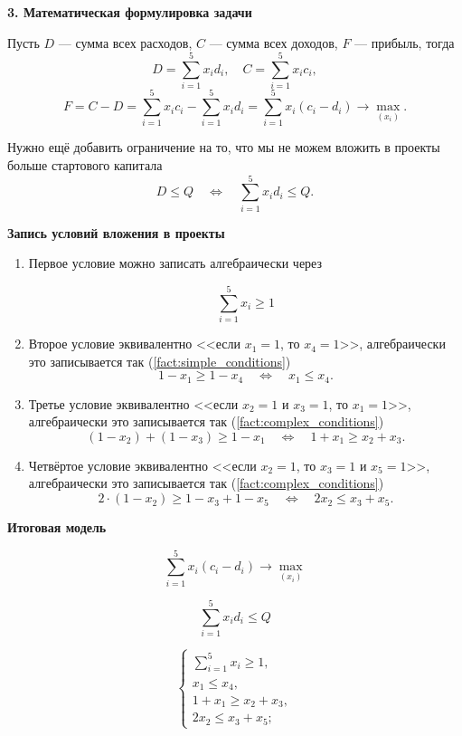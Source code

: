 \bigskip

\textbf{3. Математическая формулировка задачи}

Пусть $D$ --- сумма всех расходов, $C$ --- сумма всех доходов, $F$ --- прибыль, тогда
\[
D = \sum_{i=1}^5 x_i d_i, \quad C = \sum_{i=1}^5 x_i c_i,
\]
\[
F = C - D = \sum_{i=1}^5 x_i c_i - \sum_{i=1}^5 x_i d_i = \sum_{i=1}^5 x_i (c_i - d_i) \to \max_{(x_i)}.
\]

Нужно ещё добавить ограничение на то, что мы не можем вложить в проекты больше стартового капитала
\[
	D \le Q \quad \Longleftrightarrow \quad \sum_{i=1}^5 x_i d_i \le Q.
\]

\bigskip

\textbf{Запись условий вложения в проекты}

\begin{enumerate}[nosep]
	\item Первое условие можно записать алгебраически через
	
	\[
	\sum_{i=1}^{5} x_i \ge 1
	\]
	
	\item Второе условие эквивалентно <<если $x_1 = 1$, то $x_4 = 1$>>, алгебраически это записывается так (\cref{fact:simple_conditions})
	\[
	1 - x_1 \ge 1 - x_4 \quad \Longleftrightarrow \quad x_1 \le x_4.
	\]
	
	\item Третье условие эквивалентно <<если $x_2 = 1$ и $x_3 = 1$, то $x_1 = 1$>>, алгебраически это записывается так (\cref{fact:complex_conditions})
	\[
	(1 - x_2) + (1 - x_3) \ge 1 - x_1 \quad \Longleftrightarrow \quad 1 + x_1 \ge x_2 + x_3.
	\]
	
	\item Четвёртое условие эквивалентно <<если $x_2 = 1$, то $x_3 = 1$ и $x_5 = 1$>>, алгебраически это записывается так (\cref{fact:complex_conditions})
	\[
	2 \cdot (1 - x_2) \ge 1 - x_3 + 1 - x_5 \quad \Longleftrightarrow \quad 2x_2 \le x_3 + x_5.
	\]
\end{enumerate}

\bigskip

\textbf{Итоговая модель}

\[
\sum_{i=1}^5 x_i (c_i - d_i) \to \max_{(x_i)}
\]

\[
\sum_{i=1}^5 x_i d_i \le Q
\]

\[
\begin{cases}
	\sum\limits_{i=1}^{5} x_i \ge 1, \\
	x_1 \le x_4, \\
	1 + x_1 \ge x_2 + x_3, \\
	2x_2 \le x_3 + x_5;
\end{cases}
\]

